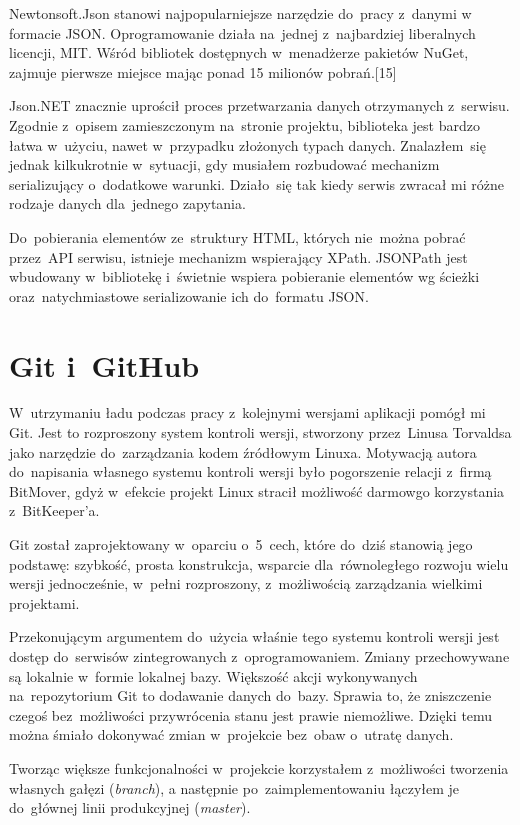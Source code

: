 \documentclass[a4paper,twoside,titlepage,openright]{book}
\begin{document}
Newtonsoft.Json stanowi najpopularniejsze narzędzie do~pracy z~danymi w formacie JSON. Oprogramowanie działa na~jednej z~najbardziej liberalnych licencji, MIT.\cite{mitLicence} Wśród bibliotek dostępnych w~menadżerze pakietów NuGet, zajmuje pierwsze miejsce mając ponad 15 milionów pobrań.[15] 

Json.NET znacznie uprościł proces przetwarzania danych otrzymanych z~serwisu. Zgodnie z~opisem zamieszczonym na~stronie projektu, biblioteka jest bardzo łatwa w~użyciu, nawet w~przypadku złożonych typach danych. Znalazłem~się jednak kilkukrotnie w~sytuacji, gdy musiałem rozbudować mechanizm serializujący o~dodatkowe warunki. Działo~się tak kiedy serwis zwracał mi różne rodzaje danych dla~jednego zapytania. 

Do~pobierania elementów ze~struktury HTML, których nie~można pobrać przez~API serwisu, istnieje mechanizm wspierający XPath. JSONPath \cite{jsonPath} jest wbudowany w~bibliotekę i~świetnie wspiera pobieranie elementów wg ścieżki oraz~natychmiastowe serializowanie ich do~formatu JSON.


\section{Git i~GitHub}
W~utrzymaniu ładu podczas pracy z~kolejnymi wersjami aplikacji pomógł mi Git. Jest to rozproszony system kontroli wersji, stworzony przez~Linusa Torvaldsa jako narzędzie do~zarządzania kodem źródłowym Linuxa. Motywacją autora do~napisania własnego systemu kontroli wersji było pogorszenie relacji z~firmą BitMover, gdyż w~efekcie projekt Linux stracił możliwość darmowgo korzystania z~BitKeeper'a. 

Git został zaprojektowany w~oparciu o~5~cech, które do~dziś stanowią jego podstawę: szybkość, prosta konstrukcja, wsparcie dla~równoległego rozwoju wielu wersji jednocześnie, w~pełni rozproszony, z~możliwością zarządzania wielkimi projektami.\cite{git}

Przekonującym argumentem do~użycia właśnie tego systemu kontroli wersji jest dostęp do~serwisów zintegrowanych z~oprogramowaniem. Zmiany przechowywane są lokalnie w~formie lokalnej bazy. Większość akcji wykonywanych na~repozytorium Git to dodawanie danych do~bazy. Sprawia to, że zniszczenie czegoś bez~możliwości przywrócenia stanu jest prawie niemożliwe. Dzięki temu można śmiało dokonywać zmian w~projekcie bez~obaw o~utratę danych. 

Tworząc większe funkcjonalności w~projekcie korzystałem z~możliwości tworzenia własnych gałęzi (\textit{branch}), a następnie po~zaimplementowaniu łączyłem je do~głównej linii produkcyjnej (\textit{master}).
\end{document}
